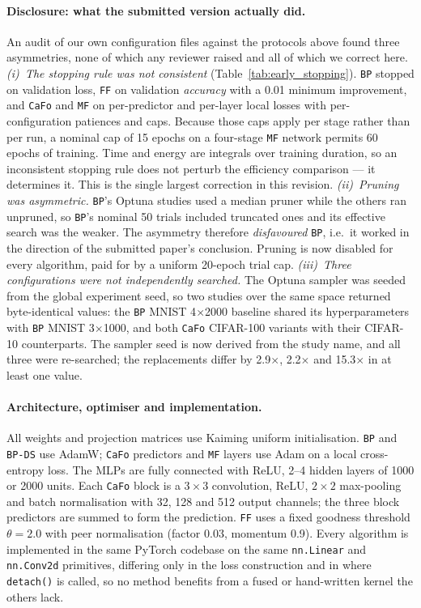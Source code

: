 \documentclass{llncs}
\newcommand{\FF}{\texttt{FF}}
\newcommand{\MF}{\texttt{MF}}
\newcommand{\BP}{\texttt{BP}}
\newcommand{\CaFo}{\texttt{CaFo}}
\begin{document}
\paragraph{Disclosure: what the submitted version actually did.}
An audit of our own configuration files against the protocols above found
three asymmetries, none of which any reviewer raised and all of which we
correct here.
\emph{(i)~The stopping rule was not consistent}
(Table~\ref{tab:early_stopping}). \BP{} stopped on validation loss, \FF{} on
validation \emph{accuracy} with a \num{0.01} minimum improvement, and \CaFo{}
and \MF{} on per-predictor and per-layer local losses with per-configuration
patiences and caps. Because those caps apply per stage rather than per run, a
nominal cap of 15 epochs on a four-stage \MF{} network permits 60 epochs of
training. Time and energy are integrals over training duration, so an
inconsistent stopping rule does not perturb the efficiency comparison --- it
determines it. This is the single largest correction in this revision.
\emph{(ii)~Pruning was asymmetric.} \BP{}'s Optuna studies used a median
pruner while the others ran unpruned, so \BP{}'s nominal 50 trials included
truncated ones and its effective search was the weaker. The asymmetry
therefore \emph{disfavoured} \BP{}, i.e.\ it worked in the direction of the
submitted paper's conclusion. Pruning is now disabled for every algorithm,
paid for by a uniform \num{20}-epoch trial cap.
\emph{(iii)~Three configurations were not independently searched.} The Optuna
sampler was seeded from the global experiment seed, so two studies over the
same space returned byte-identical values: the \BP{} MNIST 4$\times$2000
baseline shared its hyperparameters with \BP{} MNIST 3$\times$1000, and both
\CaFo{} CIFAR-100 variants with their CIFAR-10 counterparts. The sampler seed
is now derived from the study name, and all three were re-searched; the
replacements differ by \num{2.9}$\times$, \num{2.2}$\times$ and
\num{15.3}$\times$ in at least one value.



\paragraph{Architecture, optimiser and implementation.}
All weights and projection matrices use Kaiming uniform initialisation.
\BP{} and \texttt{BP-DS} use AdamW; \CaFo{} predictors and \MF{} layers use
Adam on a local cross-entropy loss. The MLPs are fully connected with ReLU,
2--4 hidden layers of 1000 or 2000 units. Each \CaFo{} block is a
$3{\times}3$ convolution, ReLU, $2{\times}2$ max-pooling and batch
normalisation with 32, 128 and 512 output channels; the three block
predictors are summed to form the prediction. \FF{} uses a fixed goodness
threshold $\theta=2.0$ with peer normalisation (factor 0.03, momentum 0.9).
Every algorithm is implemented in the same PyTorch codebase on the same
\texttt{nn.Linear} and \texttt{nn.Conv2d} primitives, differing only in the
loss construction and in where \texttt{detach()} is called, so no method
benefits from a fused or hand-written kernel the others lack.
\end{document}
